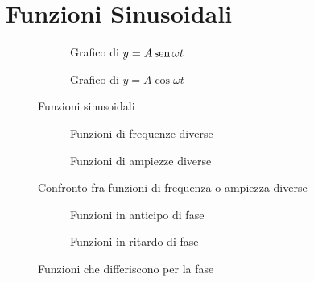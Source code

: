 \section{Funzioni Sinusoidali}
\label{sec:FunzioniSinusoidali}
\begin{figure}[H]
	\begin{subfigure}[b]{.5\linewidth}
		\centering
		\caption{Grafico di $y=A\operatorname{sen}\omega t$}\label{fig:asinomegat}
	\end{subfigure}%
	\qquad\qquad
	\begin{subfigure}[b]{.5\linewidth}
		\centering
		\caption{Grafico di $y=A\cos\omega t$}\label{fig:acosomegat}
	\end{subfigure}
	\caption{Funzioni sinusoidali}
	\label{fig:Funzionisinusoidali}
\end{figure}
\begin{figure}[H]
	\begin{subfigure}[b]{.5\linewidth}
		\centering
		\caption{Funzioni di frequenze diverse}\label{fig:frequenzediverse}
	\end{subfigure}%
		\qquad\qquad
	\begin{subfigure}[b]{.5\linewidth}
		\centering
		\caption{Funzioni di ampiezze diverse}\label{fig:ampiezzediverse}
	\end{subfigure}
	\caption{Confronto fra funzioni di frequenza o ampiezza diverse}
	\label{fig:ampiezzediversefrequenzediverse}
\end{figure}
\begin{figure}
	\begin{subfigure}[b]{.5\linewidth}
		\centering
		\caption{Funzioni in anticipo di fase}\label{fig:AsinomegaTSfasamentoAnticipato}
	\end{subfigure}%
		\qquad\qquad
	\begin{subfigure}[b]{.5\linewidth}
		\centering
		\caption{Funzioni in ritardo di fase}\label{fig:AsinomegaTSfasamentoRitardato}
	\end{subfigure}
	\caption{Funzioni che differiscono per la fase}%
	\label{fig:Funzionichedifferisconoperlafase}%
\end{figure}
